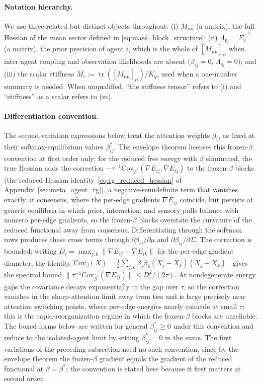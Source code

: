 \documentclass[11pt]{article}
\begin{document}
\paragraph{Notation hierarchy.}
We use three related but distinct objects throughout: (i) $M_{\mu\mu}$ (a matrix), the full Hessian of the mean sector defined in \eqref{eq:mass_block_structure}; (ii) $\bar{\Lambda}_{p_i} = \bar{\Sigma}_i^{-1}$ (a matrix), the prior precision of agent $i$, which is the whole of $[M_{\mu\mu}]_{ii}$ when inter-agent coupling and observation likelihoods are absent ($\beta_{ij}=0$, $\Lambda_{o_i}=0$); and (iii) the scalar stiffness $\bar{M}_i := \operatorname{tr}([M_{\mu\mu}]_{ii})/K_q$, used when a one-number summary is needed. When unqualified, ``the stiffness tensor'' refers to (i) and ``stiffness'' as a scalar refers to (iii).

\paragraph{Differentiation convention.}
The second-variation expressions below treat the attention weights $\beta_{ij}$ as fixed at their softmax-equilibrium values $\beta_{ij}^*$. The envelope theorem licenses this frozen-$\beta$ convention at first order only: for the reduced free energy with $\beta$ eliminated, the true Hessian adds the correction $-\tau^{-1}\mathrm{Cov}_{\beta^*}(\nabla E_{ij}, \nabla E_{ij})$ to the frozen-$\beta$ blocks (the reduced-Hessian identity~\eqref{eq:rg_reduced_hessian} of Appendix~\ref{sec:meta_agent_rg}), a negative-semidefinite term that vanishes exactly at consensus, where the per-edge gradients $\nabla E_{ij}$ coincide, but persists at generic equilibria in which prior, interaction, and sensory pulls balance with nonzero per-edge gradients, so the frozen-$\beta$ blocks overstate the curvature of the reduced functional away from consensus. Differentiating through the softmax rows produces these cross terms through $\partial \beta_{ij}/\partial \mu$ and $\partial \beta_{ij}/\partial \Sigma$. The correction is bounded: writing $D_i = \max_{j,k}\|\nabla E_{ij} - \nabla E_{ik}\|$ for the per-edge gradient diameter, the identity $\mathrm{Cov}_\beta(X) = \tfrac{1}{2}\sum_{j,k}\beta_j\beta_k(X_j - X_k)(X_j - X_k)^\top$ gives the spectral bound $\|\tau^{-1}\mathrm{Cov}_{\beta^*}(\nabla E_{ij})\| \le D_i^2/(2\tau)$. At nondegenerate energy gaps the covariance decays exponentially in the gap over $\tau$, so the correction vanishes in the sharp-attention limit away from ties and is large precisely near attention switching points, where per-edge energies nearly coincide at small $\tau$; this is the rapid-reorganization regime in which the frozen-$\beta$ blocks are unreliable. The boxed forms below are written for general $\beta_{ij}^* \geq 0$ under this convention and reduce to the isolated-agent limit by setting $\beta_{ij}^* = 0$ in the sums. The first variations of the preceding subsection need no such convention, since by the envelope theorem the frozen-$\beta$ gradient equals the gradient of the reduced functional at $\beta = \beta^*$; the convention is stated here because it first matters at second order.
\end{document}
